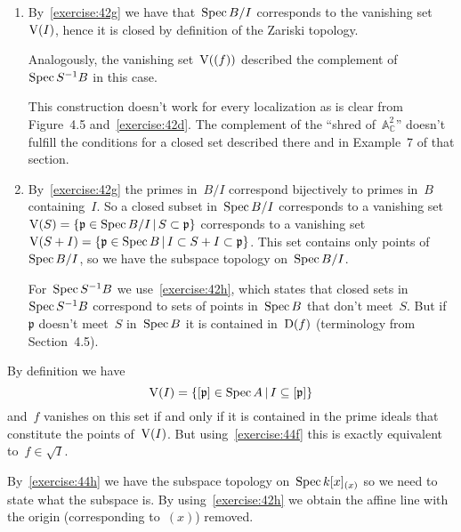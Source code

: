 \begin{exercise} %
  \label{exercise:44h}
  \begin{enumerate}
    \item By~\autoref{exercise:42g} we have that~$\operatorname{Spec} B/I$ corresponds to the vanishing set~$\operatorname{V}(I)$, hence it is closed by definition of the Zariski topology.

      Analogously, the vanishing set~$\operatorname{V}((f))$ described the complement of~$\operatorname{Spec} S^{-1}B$ in this case.

      This construction doesn't work for every localization as is clear from Figure~4.5 and~\autoref{exercise:42d}. The complement of the ``shred of~$\mathbb{A}_{\mathbb{C}}^2$'' doesn't fulfill the conditions for a closed set described there and in Example~7 of that section.

    \item By~\autoref{exercise:42g} the primes in~$B/I$ correspond bijectively to primes in~$B$ containing~$I$. So a closed subset in~$\operatorname{Spec} B/I$ corresponds to a vanishing set~$\operatorname{V}(S)=\left\{ \mathfrak{p}\in\operatorname{Spec} B/I\,|\,S\subset\mathfrak{p} \right\}$ corresponds to a vanishing set~$\operatorname{V}(S+I)=\left\{ \mathfrak{p}\in\operatorname{Spec} B\,|\,I\subset S+I\subset\mathfrak{p} \right\}$. This set contains only points of~$\operatorname{Spec} B/I$, so we have the subspace topology on~$\operatorname{Spec} B/I$.

      For~$\operatorname{Spec} S^{-1}B$ we use~\autoref{exercise:42h}, which states that closed sets in~$\operatorname{Spec} S^{-1}B$ correspond to sets of points in~$\operatorname{Spec} B$ that don't meet~$S$. But if~$\mathfrak{p}$ doesn't meet~$S$ in~$\operatorname{Spec} B$ it is contained in~$\operatorname{D}(f)$ (terminology from Section~4.5).
  \end{enumerate}
\end{exercise}

\begin{exercise}
  \label{exercise:44i}
  By definition we have
  \begin{equation}
    \operatorname{V}(I)=\left\{ [\mathfrak{p}]\in\operatorname{Spec} A\,|\,I\subseteq[\mathfrak{p}] \right\}
  \end{equation}
  and~$f$ vanishes on this set if and only if it is contained in the prime ideals that constitute the points of~$\operatorname{V}(I)$. But using~\autoref{exercise:44f} this is exactly equivalent to~$f\in\sqrt{I}$.
\end{exercise}

\begin{exercise}
  By~\autoref{exercise:44h} we have the subspace topology on~$\operatorname{Spec} k[x]_{(x)}$ so we need to state what the subspace is. By using~\autoref{exercise:42h} we obtain the affine line with the origin (corresponding to~$(x)$) removed.
\end{exercise}



